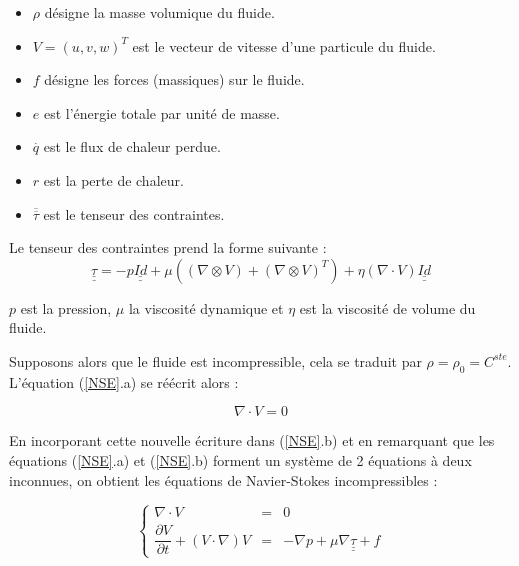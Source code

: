 \documentclass[10pt,a4paper]{amsart}
\begin{document}
\begin{itemize}
\item $\rho$ désigne la masse volumique du fluide.

\item $V = (u, v, w)^T$ est le vecteur de vitesse d'une particule du fluide.

\item $f$ désigne les forces (massiques) sur le fluide.

\item $e$ est l'énergie totale par unité de masse.

\item $\overset{\cdot}{q}$ est le flux de chaleur perdue.

\item $r$ est la perte de chaleur.

\item $\overline{\overline{\tau}}$ est le tenseur des contraintes.
\end{itemize}

Le tenseur des contraintes prend la forme suivante :
\begin{equation}\label{tenseur_contraintes}
\underline{\underline{\tau}} = -p \underline{\underline{Id}} + \mu \left( \left( \nabla \otimes V \right) + \left( \nabla \otimes V \right)^T \right) + \eta \left( \nabla \cdot V \right) \underline{\underline{Id}}
\end{equation}

$p$ est la pression, $\mu$ la viscosité dynamique et $\eta$ est la viscosité de volume du fluide.

Supposons alors que le fluide est incompressible, cela se traduit par $\rho = \rho_0 = C^{ste}$. L'équation (\ref{NSE}.a) se réécrit alors :

\begin{equation}
\nabla \cdot V = 0
\end{equation}

En incorporant cette nouvelle écriture dans (\ref{NSE}.b) et en remarquant que les équations (\ref{NSE}.a) et (\ref{NSE}.b) forment un système de 2 équations à deux inconnues, on obtient les équations de Navier-Stokes incompressibles :

\begin{equation}\label{NSE_incompressible}
\left\{
\begin{array}{rcl}

\nabla \cdot V & = & 0 \\

\dfrac{\partial V}{\partial t} + \left( V \cdot \nabla \right) V & = & - \nabla p + \mu \nabla \underline{\underline{\tau}} + f

\end{array}
\right.
\end{equation}
\end{document}
